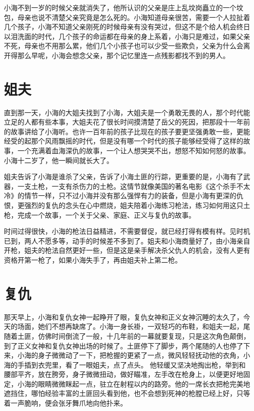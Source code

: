 小海不到一岁的时候父亲就消失了，他所认识的父亲是庄上乱坟岗矗立的一个坟包，母亲也说不清楚父亲究竟是怎么死的。小海知道母亲很苦，需要一个人拉扯着几个孩子，小海不知道父亲刚死的时候母亲有没有哭过，但这不是个给人机会终日以泪洗面的时代，几个孩子的命运都在母亲的身上系着，小海只是难过，如果父亲不死，母亲也不用那么累，他们几个小孩子也可以少受一些欺负，父亲为什么会离开得那么早呢，小海会想念父亲，那个记忆里连一点残影都找不到的男人。


\section*{姐夫}

直到那一天，小海的大姐夫找到了小海，大姐夫是一个勇敢无畏的人，那个时代能立足的人都有些本事，大姐夫花了很长时间摸清楚了岳父的死因，把那段十一年前的故事讲给了小海听。也许一百年前的孩子比现在的孩子要更坚强勇敢一些，更能经受的起那个风雨飘摇的时代，但是没有哪一个时代的孩子能够经受得了这样的故事，一个充满着血海深仇的故事，一个让人想哭哭不出，想怒不知如何怒的故事。小海十二岁了，他一瞬间就长大了。

姐夫告诉了小海是谁杀了父亲，告诉了小海土匪的行踪，更重要的是，小海有了武器，一支土枪，一支有杀伤力的土枪。这情节就像美国的著名电影《这个杀手不太冷》的情节一样，只不过小海并没有那么强悍有力的装备，但是小海有更深的仇恨，更强烈的复仇的念头在心中燃烧，姐夫陪着小海练习枪法，练习如何用这只土枪，完成一个故事，一个关于父亲、家庭、正义与复仇的故事。

时间过得很快，小海的枪法日益精进，不需要督促，就已经打得有模有样。见时机已到，两人不愿多等，动手的时候差不多到了。姐夫和小海商量好了，由小海亲自开枪，姐夫的枪法自然更好一些，但是这是亲手解决杀父仇人的机会，没有人更有资格开第一枪了，如果小海失手了，再由姐夫补上第二枪。


\section*{复仇}

那天早上，小海和复仇女神一起睁开了眼，复仇女神和正义女神沉睡的太久了，今天的场面，她们不想再缺席了。小海一身长褂，一双轻巧的布鞋，和姐夫一起，尾随着土匪，仿佛时间倒流了一般，十几年前的一幕就要复现，只是这次角色颠倒，到了正义女神和复仇女神出场的时候了。土匪停下了脚步，两个尾随的人也停了下来，小海的身子微微动了一下，把枪握的更紧了一点，微风轻轻抚动他的衣角，小海的手插到衣兜里，看了一眼姐夫，点了点头。 他轻缓又坚决地掏出枪，举到和腰部平齐，放在胯旁，身子微微扭动，做好瞄准，左手改在枪身上，以便更好地固定，小海的眼睛微微眯起一点，驻立在射程以内的路旁。他的一席长衣把枪完美地遮挡住，哪怕经验丰富的土匪回头看到他，也不会想到死神的枪膛已经上好，只等着一声脆响，便会张牙舞爪地向他扑来。

